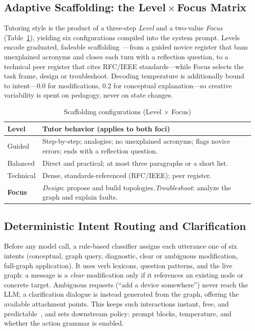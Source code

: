 \documentclass[conference,a4paper]{IEEEtran}
\begin{document}
\subsection{Adaptive Scaffolding: the Level\texorpdfstring{\,$\times$\,}{x}Focus Matrix}
Tutoring style is the product of a three-step \emph{Level} and a two-value \emph{Focus} (Table~\ref{tab:modes}), yielding six configurations compiled into the system prompt. Levels encode graduated, fadeable scaffolding~\cite{wood1976role,reiser2004scaffolding}---from a guided novice register that bans unexplained acronyms and closes each turn with a reflection question, to a technical peer register that cites RFC/IEEE standards---while Focus selects the task frame, design or troubleshoot. Decoding temperature is additionally bound to intent---0.0 for modifications, 0.2 for conceptual explanation---so creative variability is spent on pedagogy, never on state changes.

\begin{table}[!tb]
\caption{Scaffolding configurations (Level $\times$ Focus)}
\label{tab:modes}
\centering
\scriptsize
\begin{tabular}{@{}lp{6.0cm}@{}}
\toprule
\textbf{Level} & \textbf{Tutor behavior (applies to both foci)} \\
\midrule
Guided    & Step-by-step; analogies; no unexplained acronyms; flags novice errors; ends with a reflection question. \\
Balanced  & Direct and practical; at most three paragraphs or a short list. \\
Technical & Dense, standards-referenced (RFC/IEEE); peer register. \\
\midrule
\textbf{Focus} & \emph{Design}: propose and build topologies.\quad \emph{Troubleshoot}: analyze the graph and explain faults. \\
\bottomrule
\end{tabular}
\end{table}

\subsection{Deterministic Intent Routing and Clarification}
Before any model call, a rule-based classifier assigns each utterance one of six intents (conceptual, graph query, diagnostic, clear or ambiguous modification, full-graph application). It uses verb lexicons, question patterns, and the live graph: a message is a \emph{clear} modification only if it references an existing node or concrete target. Ambiguous requests (``add a device somewhere'') never reach the LLM; a clarification dialogue is instead generated from the graph, offering the available attachment points. This keeps such interactions instant, free, and predictable~\cite{vanlehn2011relative}, and sets downstream policy: prompt blocks, temperature, and whether the action grammar is enabled.
\end{document}
